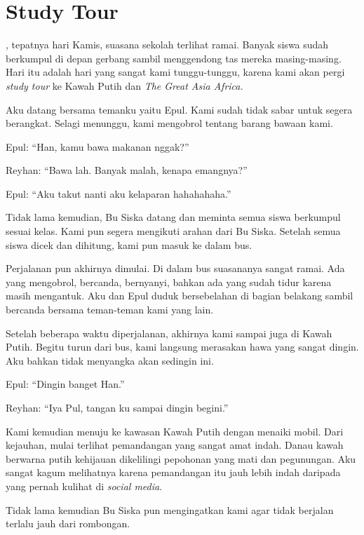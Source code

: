 \chapter*{Study Tour}


, tepatnya hari Kamis, suasana sekolah terlihat ramai. Banyak siswa sudah berkumpul di depan gerbang sambil menggendong tas mereka masing-masing. Hari itu adalah hari yang sangat kami tunggu-tunggu, karena kami akan pergi \textit{study tour} ke Kawah Putih dan \textit{The Great Asia Africa.}


Aku datang bersama temanku yaitu Epul. Kami sudah tidak sabar untuk segera berangkat. Selagi menunggu, kami mengobrol tentang barang bawaan kami.


Epul: ``Han, kamu bawa makanan nggak?''


Reyhan: ``Bawa lah. Banyak malah, kenapa emangnya?''


Epul: ``Aku takut nanti aku kelaparan hahahahaha.''

Tidak lama kemudian, Bu Siska datang dan meminta semua siswa berkumpul sesuai kelas. Kami pun segera mengikuti arahan dari Bu Siska. Setelah semua siswa dicek dan dihitung, kami pun masuk ke dalam bus.


Perjalanan pun akhirnya dimulai. Di dalam bus suasananya sangat ramai. Ada yang mengobrol, bercanda, bernyanyi, bahkan ada yang sudah tidur karena masih mengantuk. Aku dan Epul duduk bersebelahan di bagian belakang sambil bercanda bersama teman-teman kami yang lain.


Setelah beberapa waktu diperjalanan, akhirnya kami sampai juga di Kawah Putih. Begitu turun dari bus, kami langsung merasakan hawa yang sangat dingin. Aku bahkan tidak menyangka akan sedingin ini.


Epul: ``Dingin banget Han.''


Reyhan: ``Iya Pul, tangan ku sampai dingin begini.''


Kami kemudian menuju ke kawasan Kawah Putih dengan menaiki mobil. Dari kejauhan, mulai terlihat pemandangan yang sangat amat indah. Danau kawah berwarna putih kehijauan dikelilingi pepohonan yang mati dan pegunungan. Aku sangat kagum melihatnya karena pemandangan itu jauh lebih indah daripada yang pernah kulihat di \textit{social media}.


Tidak lama kemudian Bu Siska pun mengingatkan kami agar tidak berjalan terlalu jauh dari rombongan.


